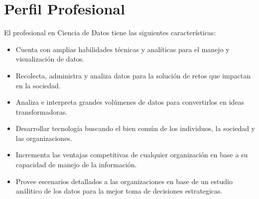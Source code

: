 \section{Perfil Profesional}\label{sec:professional-profile}
El profesional en Ciencia de Datos tiene las siguientes características:

\begin{itemize}

\item Cuenta con amplias habilidades técnicas y analíticas para el manejo y visualización de datos.
\item Recolecta, administra y analiza datos para la solución de retos que impactan en la sociedad.
\item Analiza e interpreta grandes volúmenes de datos para convertirlos en ideas transformadoras.
\item Desarrollar tecnología buscando el bien común de los individuos, la sociedad y las organizaciones.
\item Incrementa las ventajas competitivas de cualquier organización en base a su capacidad de manejo de la información.
\item Provee escenarios detallados a las organizaciones en base de un estudio análitico de los datos para la mejor toma de decisiones estrategicas.
\end{itemize}
